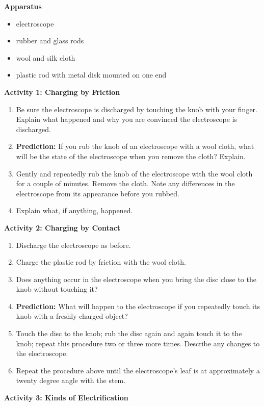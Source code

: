 \textbf{Apparatus}

\begin{itemize}
\item electroscope
\item rubber and glass rods
\item wool and silk cloth
\item plastic rod with metal disk mounted on one end
\end{itemize}
\textbf{Activity 1: Charging by Friction}

\begin{enumerate}
\item Be sure the electroscope is discharged by touching the knob with your
finger. Explain what happened and why you are convinced the electroscope
is discharged.\vspace{15mm}

\item \textbf{Prediction:} If you rub the knob of an electroscope with a
wool cloth, what will be the state of the electroscope when you remove
the cloth? Explain.\vspace{15mm}

\item Gently and repeatedly rub the knob of the electroscope with the wool cloth for a couple of minutes. Remove the cloth. Note any differences in the electroscope from its appearance before you rubbed.\vspace{15mm}

\item Explain what, if anything, happened.\vspace{15mm}

\end{enumerate}
\textbf{Activity 2: Charging by Contact}

\begin{enumerate}
\item Discharge the electroscope as before.
\item Charge the plastic rod by friction with
the wool cloth.
\item Does anything occur in the electroscope when you bring the disc close
to the knob without touching it?\vspace{15mm}

\item \textbf{Prediction:} What will happen to the electroscope if you repeatedly
touch its knob with a freshly charged object?\vspace{15mm}

\item Touch the disc to the knob; rub the disc again and again touch it
to the knob; repeat this procedure two or three more times. Describe
any changes to the electroscope.\vspace{15mm}

\item Repeat the procedure above until the electroscope's leaf is at approximately
a twenty degree angle with the stem.
\end{enumerate}
\textbf{Activity 3: Kinds of Electrification}

